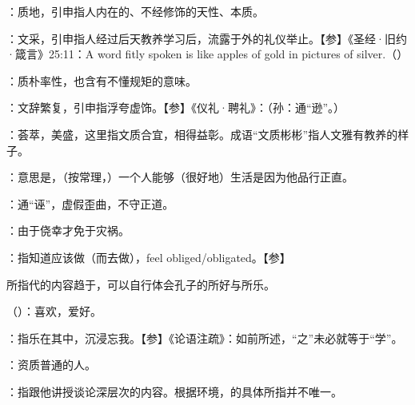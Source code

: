 {
\item {}：质地，引申指人内在的、不经修饰的天性、本质。

：文采，引申指人经过后天教养学习后，流露于外的礼仪举止。【参】《圣经·旧约·箴言》25:11：A word fitly spoken is like apples of gold in pictures of silver.（）
\item {}：质朴率性，也含有不懂规矩的意味。

：文辞繁复，引申指浮夸虚饰。【参】《仪礼·聘礼》：（孙：通“逊”。）
\item {}：荟萃，美盛，这里指文质合宜，相得益彰。成语“文质彬彬”指人文雅有教养的样子。
}
{}


{
\item {}：意思是，（按常理，）一个人能够（很好地）生活是因为他品行正直。
\item {}：通“诬”，虚假歪曲，不守正道。
\item {}：由于侥幸才免于灾祸。
}
{}


{
\item {}：指知道应该做（而去做），feel obliged/obligated。【参】

所指代的内容趋于，可以自行体会孔子的所好与所乐。
\item {}（）：喜欢，爱好。
\item {}：指乐在其中，沉浸忘我。【参】《论语注疏》：如前所述，“之”未必就等于“学”。
}
{}


{
\item {}：资质普通的人。
\item {}：指跟他讲授谈论深层次的内容。根据环境，的具体所指并不唯一。
}
{}


